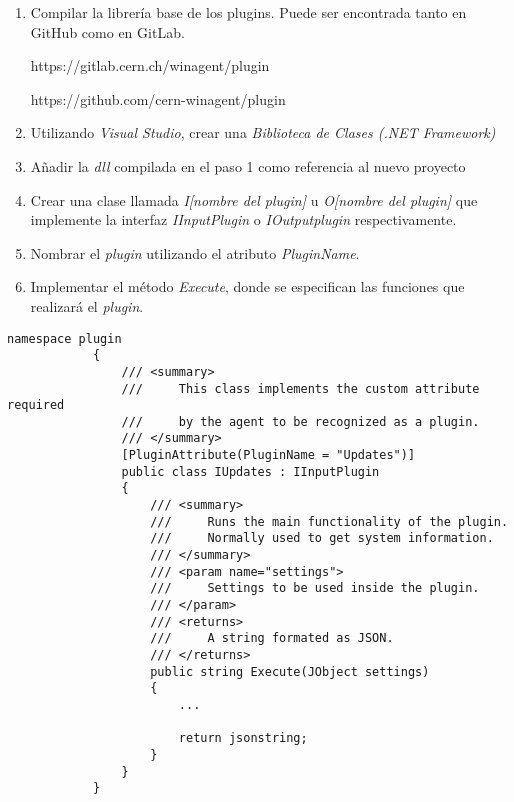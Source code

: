         \begin{enumerate}
            \item Compilar la librería base de los plugins. Puede ser encontrada tanto en GitHub como en GitLab.
            
            https://gitlab.cern.ch/winagent/plugin
            
            https://github.com/cern-winagent/plugin
            
            \item Utilizando \textit{Visual Studio}, crear una \textit{Biblioteca de Clases (.NET Framework)}
            
            \item Añadir la \textit{dll} compilada en el paso 1 como referencia al nuevo proyecto
            
            \item Crear una clase llamada \textit{I[nombre del plugin]} u \textit{O[nombre del plugin]} que implemente la interfaz \textit{IInputPlugin} o \textit{IOutputplugin} respectivamente.
            
            \item Nombrar el \textit{plugin} utilizando el atributo \textit{PluginName}.
            
            \item Implementar el método \textit{Execute}, donde se especifican las funciones que realizará el \textit{plugin}.
        \end{enumerate}
    
        \begin{lstlisting}[style=csharp, caption=Plugin de entrada]
            namespace plugin
            {
                /// <summary>
                ///     This class implements the custom attribute required
                ///     by the agent to be recognized as a plugin.
                /// </summary>
                [PluginAttribute(PluginName = "Updates")]
                public class IUpdates : IInputPlugin
                {
                    /// <summary>
                    ///     Runs the main functionality of the plugin.
                    ///     Normally used to get system information.
                    /// </summary>
                    /// <param name="settings">
                    ///     Settings to be used inside the plugin.
                    /// </param>
                    /// <returns>
                    ///     A string formated as JSON.
                    /// </returns>
                    public string Execute(JObject settings)
                    {
                        ...
            
                        return jsonstring;
                    }
                }
            }
        \end{lstlisting}
        
